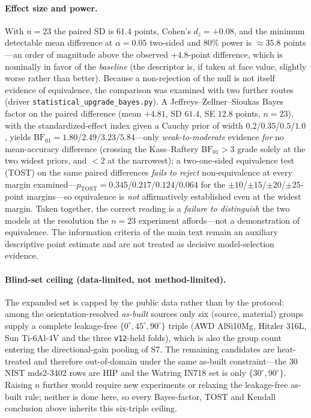\documentclass[12pt,a4paper,twocolumn]{article}
\providecommand{\ang}[1]{\ensuremath{#1^{\circ}}}
\begin{document}
\paragraph{Effect size and power.}
With $n = 23$ the paired SD is $61.4$ points, Cohen's $d_z = +0.08$, and the minimum detectable mean difference
at $\alpha = 0.05$ two-sided and $80\%$ power is $\approx 35.8$ points---an order of magnitude above the observed
$+4.8$-point difference, which is nominally in favor of the \emph{baseline} (the descriptor is, if taken at face
value, slightly worse rather than better). Because a non-rejection of the null is not itself evidence of
equivalence, the comparison was examined with two further routes (driver \texttt{statistical\_upgrade\_bayes.py}).
A Jeffreys--Zellner--Sioukas Bayes factor on the paired difference (mean $+4.81$, SD $61.4$, SE $12.8$ points,
$n = 23$), with the standardized-effect index given a Cauchy prior of width $0.2$/$0.35$/$0.5$/$1.0$, yields
$\mathrm{BF}_{01} = 1.80$/$2.49$/$3.23$/$5.84$---only \emph{weak-to-moderate} evidence \emph{for} no mean-accuracy
difference (crossing the Kass--Raftery $\mathrm{BF}_{01} > 3$ grade solely at the two widest priors, and $<2$ at the
narrowest); a two-one-sided equivalence test (TOST) on the same paired differences \emph{fails to reject}
non-equivalence at every margin examined---$p_{\mathrm{TOST}} = 0.345$/$0.217$/$0.124$/$0.064$ for the
$\pm 10$/$\pm 15$/$\pm 20$/$\pm 25$-point margins---so equivalence is \emph{not} affirmatively established even at
the widest margin. Taken together, the correct reading is a \emph{failure to distinguish} the two models at the
resolution the $n = 23$ experiment affords---not a demonstration of equivalence. The information criteria of the
main text remain an auxiliary descriptive point estimate and are not treated as decisive model-selection evidence.

\paragraph{Blind-set ceiling (data-limited, not method-limited).}
The expanded set is capped by the public data rather than by the protocol: among the orientation-resolved
\emph{as-built} sources only six (source, material) groups supply a complete leakage-free
$\{\ang{0},\ang{45},\ang{90}\}$ triple (AWD AlSi10Mg, Hitzler 316L, Sun Ti-6Al-4V and the three \texttt{v12}-held
folds), which is also the group count entering the directional-gain pooling of S7. The remaining candidates are
heat-treated and therefore out-of-domain under the same as-built constraint---the 30 NIST mds2-3402 rows are HIP and
the Watring IN718 set is only $\{\ang{30},\ang{90}\}$. Raising $n$ further would require new experiments or relaxing
the leakage-free as-built rule; neither is done here, so every Bayes-factor, TOST and Kendall conclusion above
inherits this six-triple ceiling.
\end{document}
